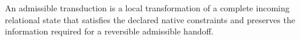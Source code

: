 \setcounter{theorem}{0}
\begin{definition}
An admissible transduction is a local transformation of a complete incoming relational state that satisfies the declared native constraints and preserves the information required for a reversible admissible handoff.
\end{definition}
